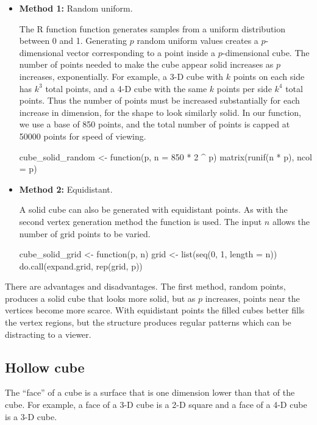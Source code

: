 \begin{itemize}

  \item {\bf Method 1:} Random uniform.

    The R function  function generates samples from a
    uniform distribution between 0 and 1. Generating $p$ random
    uniform values creates a $p$-dimensional vector corresponding to a
    point inside a $p$-dimensional cube. The number of points needed
    to make the cube appear solid increases as $p$ increases, exponentially.  For example, a 3-D
    cube with $k$ points on each side has  $k^3$ total points, and a 4-D cube
    with the same $k$ points per side $k^4$ total points. Thus the number
    of points must be increased substantially for each increase in
    dimension, for the shape to look similarly solid. In our function, we use a base of 850 points, and the total
    number of points is capped at 50000 points for speed of viewing.

\begin{example}
cube_solid_random <- function(p, n = 850 * 2 ^ p) {
  matrix(runif(n * p), ncol = p)
}
\end{example}

  \item {\bf Method 2:} Equidistant.

    A solid cube can also be generated with equidistant points. As
    with the second vertex generation method the 
    function is used. The input $n$ allows the number of grid points
    to be varied.

\begin{example}
cube_solid_grid <- function(p, n) {
  grid <- list(seq(0, 1, length = n))
  do.call(expand.grid, rep(grid, p))
}
\end{example}
\end{itemize}

There are advantages and disadvantages.  The first method, random
points, produces a solid cube that looks more solid, but as $p$
increases, points near the vertices become more scarce.  With
equidistant points the filled cubes better fills the vertex regions, but the structure  produces regular patterns which can be distracting to a viewer.

\subsection{Hollow cube}

The ``face'' of a cube is a surface that is one dimension lower than
that of the cube.  For example, a face of a 3-D cube is a 2-D square
and a face of a 4-D cube is a 3-D cube.

